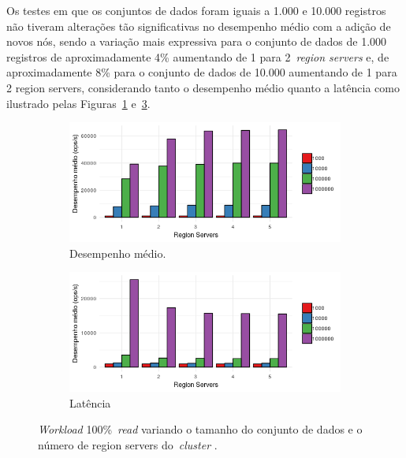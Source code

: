 \documentclass[12pt]{article}
\begin{document}
Os testes em que os conjuntos de dados foram iguais a 1.000 e 10.000 registros não tiveram alterações tão significativas no desempenho médio com a adição de novos nós, sendo a variação mais expressiva para o conjunto de dados de 1.000 registros de aproximadamente 4\% aumentando de 1 para 2~\emph{region servers} e, de aproximadamente 8\% para o conjunto de dados de 10.000 aumentando de 1 para 2 region servers, considerando tanto o desempenho médio quanto a latência como ilustrado pelas Figuras~\ref{figura17} e~\ref{figura18}.

\begin{figure}[!ht]
    \centering
    \begin{subfigure}[b]{0.49\textwidth}
        \centering
        \includegraphics[width=\textwidth]{images/figura17}
        \caption{Desempenho médio.}
        \label{figura17}
    \end{subfigure}
        \hfill
    \begin{subfigure}[b]{0.49\textwidth}  
        \centering 
        \includegraphics[width=\textwidth]{images/figura18}
        \caption{Latência}%
        \label{figura18}
    \end{subfigure}
    \caption{\emph{Workload} 100\%~\emph{read}  variando o tamanho do conjunto de dados e o número de region servers do~\emph{cluster} .}
\end{figure}
\end{document}
